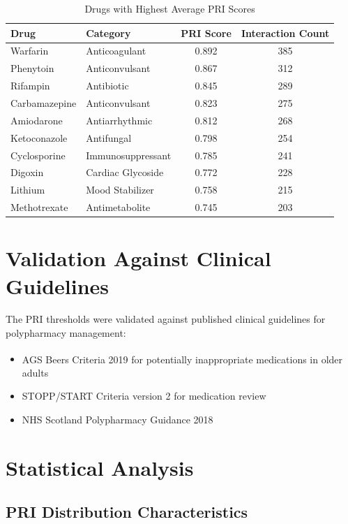 \documentclass[11pt,a4paper]{article}
\begin{document}
\begin{table}[H]
\centering
\caption{Drugs with Highest Average PRI Scores}
\label{tab:high_pri_drugs}
\begin{tabular}{llcc}
\toprule
\textbf{Drug} & \textbf{Category} & \textbf{PRI Score} & \textbf{Interaction Count} \\
\midrule
Warfarin & Anticoagulant & 0.892 & 385 \\
Phenytoin & Anticonvulsant & 0.867 & 312 \\
Rifampin & Antibiotic & 0.845 & 289 \\
Carbamazepine & Anticonvulsant & 0.823 & 275 \\
Amiodarone & Antiarrhythmic & 0.812 & 268 \\
Ketoconazole & Antifungal & 0.798 & 254 \\
Cyclosporine & Immunosuppressant & 0.785 & 241 \\
Digoxin & Cardiac Glycoside & 0.772 & 228 \\
Lithium & Mood Stabilizer & 0.758 & 215 \\
Methotrexate & Antimetabolite & 0.745 & 203 \\
\bottomrule
\end{tabular}
\end{table}

\section{Validation Against Clinical Guidelines}

The PRI thresholds were validated against published clinical guidelines for polypharmacy management:

\begin{itemize}
    \item AGS Beers Criteria\textsuperscript{\textregistered} 2019 for potentially inappropriate medications in older adults
    \item STOPP/START Criteria version 2 for medication review
    \item NHS Scotland Polypharmacy Guidance 2018
\end{itemize}

\section{Statistical Analysis}

\subsection{PRI Distribution Characteristics}
\end{document}
